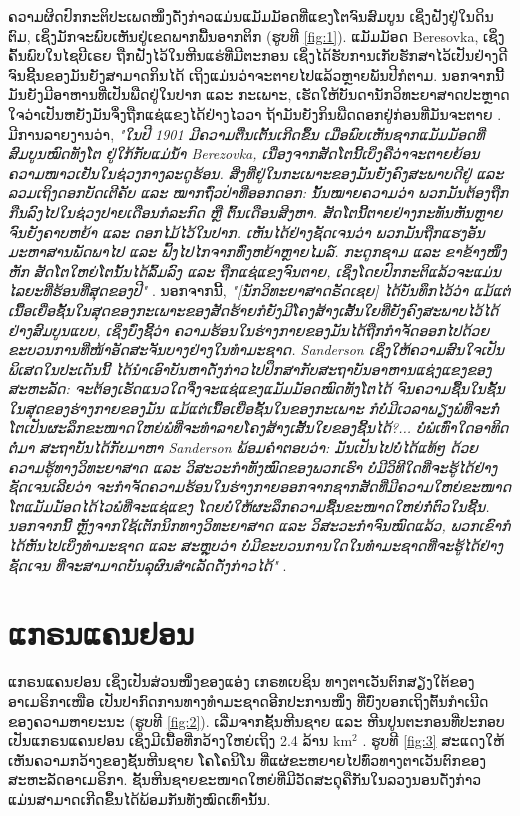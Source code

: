 \documentclass[10pt,twocolumn,letterpaper]{article}
\begin{document}
ຄວາມຜິດປົກກະຕິປະເພດໜຶ່ງດັ່ງກ່າວແມ່ນແມັມມັອດທີ່ແຂງໂຕຈົນສົມບູນ ເຊິ່ງຝັງຢູ່ໃນດິນຕົມ, ເຊິ່ງມັກຈະພົບເຫັນຢູ່ເຂດພາກພື້ນອາກຕິກ (ຮູບທີ \ref{fig:1}). ແມັມມັອດ Beresovka, ເຊິ່ງຄົ້ນພົບໃນໄຊບີເຣຍ ຖືກຝັງໄວ້ໃນຫີນແຮ່ທີ່ມີຕະກອນ ເຊິ່ງໄດ້ຮັບການເກັບຮັກສາໄວ້ເປັນຢ່າງດີ ຈົນຊີ້ນຂອງມັນຍັງສາມາດກິນໄດ້ ເຖິງແມ່ນວ່າຈະຕາຍໄປແລ້ວຫຼາຍພັນປີກໍຕາມ. ນອກຈາກນີ້ ມັນຍັງມີອາຫານທີ່ເປັນພືດຢູ່ໃນປາກ ແລະ ກະເພາະ, ເຮັດໃຫ້ບັນດານັກວິທະຍາສາດປະຫຼາດໃຈວ່າເປັນຫຍັງມັນຈຶ່ງຖືກແຊ່ແຂງໄດ້ຢ່າງໄວວາ ຖ້າມັນຍັງກິນພືດດອກຢູ່ກ່ອນທີ່ມັນຈະຕາຍ \cite{17}. ມີການລາຍງານວ່າ, \textit{"ໃນປີ 1901 ມີຄວາມຕື່ນເຕັ້ນເກີດຂຶ້ນ ເມື່ອພົບເຫັນຊາກແມັມມັອດທີ່ສົມບູນໝົດທັງໂຕ ຢູ່ໃກ້ກັບແມ່ນ້ຳ Berezovka, ເນື່ອງຈາກສັດໂຕນີ້ເບິ່ງຄືວ່າຈະຕາຍຍ້ອນຄວາມໜາວເຢັນໃນຊ່ວງກາງລະດູຮ້ອນ. ສິ່ງທີ່ຢູ່ໃນກະເພາະຂອງມັນຍັງຄົງສະພາບດີຢູ່ ແລະ ລວມເຖິງດອກບັດເຕີຄັບ ແລະ ໝາກຖົ່ວປ່າທີ່ອອກດອກ: ນັ້ນໝາຍຄວາມວ່າ ພວກມັນຕ້ອງຖືກກືນລົງໄປໃນຊ່ວງປາຍເດືອນກໍລະກົດ ຫຼື ຕົ້ນເດືອນສິງຫາ. ສັດໂຕນີ້ຕາຍຢ່າງກະທັນຫັນຫຼາຍ ຈົນຍັງຄາບຫຍ້າ ແລະ ດອກໄມ້ໄວ້ໃນປາກ. ເຫັນໄດ້ຢ່າງຊັດເຈນວ່າ ພວກມັນຖືກແຮງອັນມະຫາສານພັດພາໄປ ແລະ ຟົ້ງໄປໄກຈາກທົ່ງຫຍ້າຫຼາຍໄມລ໌. ກະດູກຊາມ ແລະ ຂາຂ້າງໜຶ່ງຫັກ ສັດໂຕໃຫຍ່ໂຕນັ້ນໄດ້ລົ້ມລົງ ແລະ ຖືກແຊ່ແຂງຈົນຕາຍ, ເຊິ່ງໂດຍປົກກະຕິແລ້ວຈະແມ່ນໄລຍະທີ່ຮ້ອນທີ່ສຸດຂອງປີ"} \cite{18}. ນອກຈາກນີ້, \textit{"[ນັກວິທະຍາສາດຣັດເຊຍ] ໄດ້ບັນທຶກໄວ້ວ່າ ແມ້ແຕ່ເນື້ອເຍື່ອຊັ້ນໃນສຸດຂອງກະເພາະຂອງສັດຮ້າຍກໍຍັງມີໂຄງສ້າງເສັ້ນໃຍທີ່ຍັງຄົງສະພາບໄວ້ໄດ້ຢ່າງສົມບູນແບບ, ເຊິ່ງບົ່ງຊີ້ວ່າ ຄວາມຮ້ອນໃນຮ່າງກາຍຂອງມັນໄດ້ຖືກກຳຈັດອອກໄປດ້ວຍຂະບວນການທີ່ໜ້າອັດສະຈັນບາງຢ່າງໃນທຳມະຊາດ. Sanderson ເຊິ່ງໃຫ້ຄວາມສົນໃຈເປັນພິເສດໃນປະເດັນນີ້ ໄດ້ນຳເອົາບັນຫາດັ່ງກ່າວໄປປຶກສາກັບສະຖາບັນອາຫານແຊ່ງແຂງຂອງສະຫະລັດ: ຈະຕ້ອງເຮັດແນວໃດຈຶ່ງຈະແຊ່ແຂງແມັມມັອດໝົດທັງໂຕໄດ້ ຈົນຄວາມຊື້ນໃນຊັ້ນໃນສຸດຂອງຮ່າງກາຍຂອງມັນ ແມ້ແຕ່ເນື້ອເຍື່ອຊັ້ນໃນຂອງກະເພາະ ກໍບໍ່ມີເວລາພຽງພໍທີ່ຈະກໍ່ໂຕເປັນຜະລຶກຂະໜາດໃຫຍ່ພໍທີ່ຈະທຳລາຍໂຄງສ້າງເສັ້ນໃຍຂອງຊີ້ນໄດ້?... ບໍ່ພໍເທົ່າໃດອາທິດຕໍ່ມາ ສະຖາບັນໄດ້ກັບມາຫາ Sanderson ພ້ອມຄຳຕອບວ່າ: ມັນເປັນໄປບໍ່ໄດ້ແທ້ໆ ດ້ວຍຄວາມຮູ້ທາງວິທະຍາສາດ ແລະ ວິສະວະກຳທັງໝົດຂອງພວກເຮົາ ບໍ່ມີວິທີໃດທີ່ຈະຮູ້ໄດ້ຢ່າງຊັດເຈນເລີຍວ່າ ຈະກຳຈັດຄວາມຮ້ອນໃນຮ່າງກາຍອອກຈາກຊາກສັດທີ່ມີຄວາມໃຫຍ່ຂະໜາດໂຕແມັມມັອດໄດ້ໄວພໍທີ່ຈະແຊ່ແຂງ ໂດຍບໍ່ໃຫ້ຜະລຶກຄວາມຊື້ນຂະໜາດໃຫຍ່ກໍ່ຕົວໃນຊີ້ນ. ນອກຈາກນີ້ ຫຼັງຈາກໃຊ້ເຕັກນິກທາງວິທະຍາສາດ ແລະ ວິສະວະກຳຈົນໝົດແລ້ວ, ພວກເຂົາກໍໄດ້ຫັນໄປເບິ່ງທຳມະຊາດ ແລະ ສະຫຼຸບວ່າ ບໍ່ມີຂະບວນການໃດໃນທຳມະຊາດທີ່ຈະຮູ້ໄດ້ຢ່າງຊັດເຈນ ທີ່ຈະສາມາດບັນລຸຜົນສຳເລັດດັ່ງກ່າວໄດ້"} \cite{19}.

\section{ແກຣນແຄນຢອນ}

ແກຣນແຄນຢອນ ເຊິ່ງເປັນສ່ວນໜຶ່ງຂອງແອ່ງ ເກຣທເບຊິນ ທາງຕາເວັນຕົກສຽງໃຕ້ຂອງອາເມຣິກາເໜືອ ເປັນປາກົດການທາງທຳມະຊາດອີກປະການໜຶ່ງ ທີ່ບົ່ງບອກເຖິງຕົ້ນກຳເນີດຂອງຄວາມຫາຍະນະ (ຮູບທີ \ref{fig:2}). ເລີ່ມຈາກຊັ້ນຫີນຊາຍ ແລະ ຫີນປູນຕະກອນທີ່ປະກອບເປັນແກຣນແຄນຢອນ ເຊິ່ງມີເນື້ອທີ່ກວ້າງໃຫຍ່ເຖິງ 2.4 ລ້ານ km$^2$ \cite{21}. ຮູບທີ \ref{fig:3} ສະແດງໃຫ້ເຫັນຄວາມກວ້າງຂອງຊັ້ນຫີນຊາຍ ໂຄໂຄນິໂນ ທີ່ແຜ່ຂະຫຍາຍໄປທົ່ວທາງຕາເວັນຕົກຂອງສະຫະລັດອາເມຣິກາ. ຊັ້ນຫີນຊາຍຂະໜາດໃຫຍ່ທີ່ມີວັດສະດຸຄືກັນໃນລວງນອນດັ່ງກ່າວ ແມ່ນສາມາດເກີດຂຶ້ນໄດ້ພ້ອມກັນທັງໝົດເທົ່ານັ້ນ.
\end{document}
